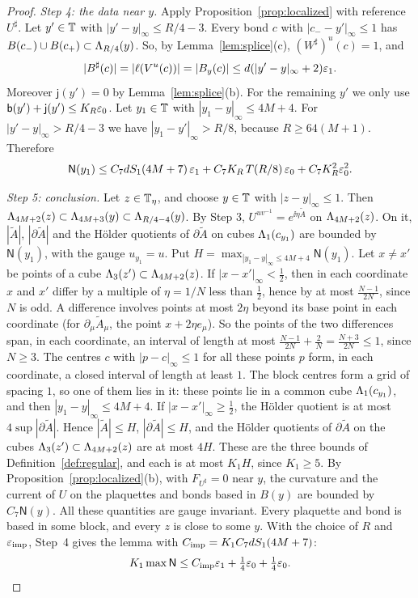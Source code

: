 \begin{proof}
\emph{Step 4: the data near $y$.} Apply Proposition~\ref{prop:localized} with reference $U^\sharp$. Let $y'\in\mathbb T$ with $|y'-y|_\infty\le R/4-3$. Every bond $c$ with $|c_--y'|_\infty\le1$ has $B(c_-)\cup B(c_+)\subset\Lambda_{R/4}(y)$. So, by Lemma~\ref{lem:splice}(c), $(W^\sharp)^u(c)=1$, and
\[
|B^\sharp(c)|=|\ell(V^u(c))|=|B_y(c)|\le d(|y'-y|_\infty+2)\varepsilon_1 .
\]
Moreover $\mathsf j(y')=0$ by Lemma~\ref{lem:splice}(b). For the remaining $y'$ we only use $\mathsf b(y')+\mathsf j(y')\le K_R\varepsilon_0$. Let $y_1\in\mathbb T$ with $|y_1-y|_\infty\le4M+4$. For $|y'-y|_\infty>R/4-3$ we have $|y_1-y'|_\infty>R/8$, because $R\ge64(M+1)$. Therefore
\[
\mathsf N(y_1)\le C_7dS_1(4M+7)\,\varepsilon_1+C_7K_R\,T(R/8)\,\varepsilon_0+C_7K_R^2\varepsilon_0^2 .
\]

\emph{Step 5: conclusion.} Let $z\in\mathbb T_\eta$, and choose $y\in\mathbb T$ with $|z-y|_\infty\le1$. Then $\Lambda_{4M+2}(z)\subset\Lambda_{4M+3}(y)\subset\Lambda_{R/4-4}(y)$. By Step 3, $U^{uv^{-1}}=e^{\ii\eta\tilde A}$ on $\Lambda_{4M+2}(z)$. On it, $|\tilde A|$, $|\partial\tilde A|$ and the H\"older quotients of $\partial\tilde A$ on cubes $\Lambda_1(c_{y_1})$ are bounded by $\mathsf N(y_1)$, with the gauge $u_{y_1}=u$. Put $H=\max_{|y_1-y|_\infty\le4M+4}\mathsf N(y_1)$. Let $x\ne x'$ be points of a cube $\Lambda_3(z')\subset\Lambda_{4M+2}(z)$. If $|x-x'|_\infty<\frac12$, then in each coordinate $x$ and $x'$ differ by a multiple of $\eta=1/N$ less than $\frac12$, hence by at most $\frac{N-1}{2N}$, since $N$ is odd. A difference involves points at most $2\eta$ beyond its base point in each coordinate (for $\partial_\mu\tilde A_\mu$, the point $x+2\eta e_\mu$). So the points of the two differences span, in each coordinate, an interval of length at most $\frac{N-1}{2N}+\frac2N=\frac{N+3}{2N}\le1$, since $N\ge3$. The centres $c$ with $|p-c|_\infty\le1$ for all these points $p$ form, in each coordinate, a closed interval of length at least $1$. The block centres form a grid of spacing $1$, so one of them lies in it: these points lie in a common cube $\Lambda_1(c_{y_1})$, and then $|y_1-y|_\infty\le4M+4$. If $|x-x'|_\infty\ge\frac12$, the H\"older quotient is at most $4\sup|\partial\tilde A|$. Hence $|\tilde A|\le H$, $|\partial\tilde A|\le H$, and the H\"older quotients of $\partial\tilde A$ on the cubes $\Lambda_3(z')\subset\Lambda_{4M+2}(z)$ are at most $4H$. These are the three bounds of Definition~\ref{def:regular}, and each is at most $K_1H$, since $K_1\ge5$. By Proposition~\ref{prop:localized}(b), with $F_{U^\sharp}=0$ near $y$, the curvature and the current of $U$ on the plaquettes and bonds based in $B(y)$ are bounded by $C_7\mathsf N(y)$. All these quantities are gauge invariant. Every plaquette and bond is based in some block, and every $z$ is close to some $y$. With the choice of $R$ and $\varepsilon_{\rm imp}$, Step~4 gives the lemma with $C_{\rm imp}=K_1C_7dS_1(4M+7)$:
\[
K_1\max\mathsf N\le C_{\rm imp}\varepsilon_1+\tfrac14\varepsilon_0+\tfrac14\varepsilon_0 .\qedhere
\]
\end{proof}

